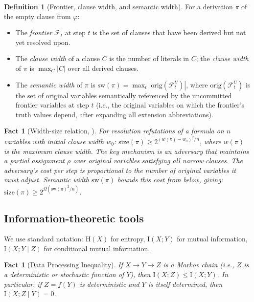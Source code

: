 \documentclass[11pt]{article}
\newtheorem{fact}[theorem]{Fact}
\theoremstyle{definition}
\newtheorem{definition}[theorem]{Definition}
\newcommand{\size}{\mathrm{size}}
\newcommand{\MI}{\mathrm{I}}
\newcommand{\Ent}{\mathrm{H}}
\newcommand{\frontier}{\mathcal{F}}
\begin{document}
\begin{definition}[Frontier, clause width, and semantic width]\label{def:frontier}
For a derivation $\pi$ of the empty clause from $\varphi$:
\begin{itemize}
\item The \emph{frontier} $\frontier_t$ at step $t$ is the set of
clauses that have been derived but not yet resolved upon.
\item The \emph{clause width} of a clause $C$ is the number of
literals in $C$; the \emph{clause width} of $\pi$ is
$\max_C |C|$ over all derived clauses.
\item The \emph{semantic width} of $\pi$ is
$\mathrm{sw}(\pi) = \max_t |\mathrm{orig}(\frontier_t^U)|$,
where $\mathrm{orig}(\frontier_t^U)$ is the set of original
variables semantically referenced by the uncommitted frontier
variables at step $t$ (i.e., the original variables on which the
frontier's truth values depend, after expanding all extension
abbreviations).
\end{itemize}
\end{definition}

\begin{fact}[Width-size relation, {\cite{BenSasson2001}}]\label{fact:BSW}
For resolution refutations of a formula on $n$ variables with initial
clause width $w_0$: $\size(\pi) \geq 2^{(w(\pi) - w_0)^2 / n}$,
where $w(\pi)$ is the maximum clause width.
The key mechanism is an adversary that maintains a partial assignment
$\rho$ over original variables satisfying all narrow clauses.  The
adversary's cost per step is proportional to the number of original
variables it must adjust.  Semantic width $\mathrm{sw}(\pi)$ bounds
this cost from below, giving:
$\size(\pi) \geq 2^{\Omega(\mathrm{sw}(\pi)^2 / n)}$.
\end{fact}

\subsection{Information-theoretic tools}

We use standard notation: $\Ent(X)$ for entropy, $\MI(X; Y)$ for mutual
information, $\MI(X; Y \mid Z)$ for conditional mutual information.

\begin{fact}[Data Processing Inequality]\label{fact:DPI}
If $X \to Y \to Z$ is a Markov chain (i.e., $Z$ is a deterministic or
stochastic function of $Y$), then $\MI(X; Z) \leq \MI(X; Y)$.  In
particular, if $Z = f(Y)$ is deterministic and $Y$ is itself determined,
then $\MI(X; Z \mid Y) = 0$.
\end{fact}
\end{document}
